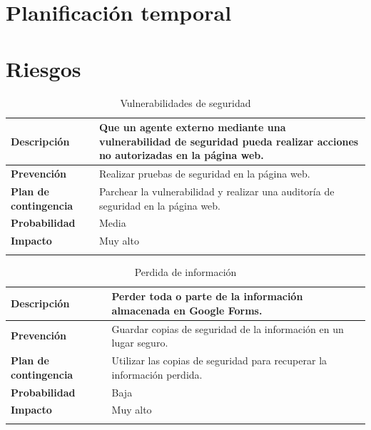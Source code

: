 \documentclass{report}
\begin{document}
    \chapter{Planificación temporal} %
    \chapter{Riesgos}
        \begin{center}
            \begin{longtable}{|p{6cm}|p{6cm}|}
                \hline
                \textbf{Descripción} & Que un agente externo mediante una vulnerabilidad de seguridad pueda realizar acciones no autorizadas en la página web.\\
                \hline
                \textbf{Prevención} & Realizar pruebas de seguridad en la página web.\\
                \hline
                \textbf{Plan de contingencia} & Parchear la vulnerabilidad y realizar una auditoría de seguridad en la página web.\\
                \hline
                \textbf{Probabilidad} & Media\\
                \hline
                \textbf{Impacto} & Muy alto\\
                \hline
                \caption{Vulnerabilidades de seguridad}
            \end{longtable}
        \end{center}
        \begin{center}
            \begin{longtable}{|p{6cm}|p{6cm}|}
                \hline
                \textbf{Descripción} & Perder toda o parte de la información almacenada en Google Forms.\\
                \hline
                \textbf{Prevención} & Guardar copias de seguridad de la información en un lugar seguro.\\
                \hline
                \textbf{Plan de contingencia} & Utilizar las copias de seguridad para recuperar la información perdida.\\
                \hline
                \textbf{Probabilidad} & Baja\\
                \hline
                \textbf{Impacto} & Muy alto\\
                \hline
                \caption{Perdida de información}
            \end{longtable}
        \end{center}
\end{document}
